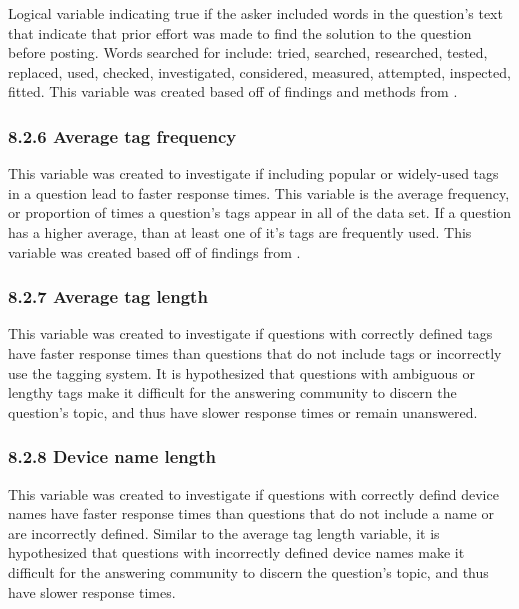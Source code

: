\documentclass{article}
\begin{document}
Logical variable indicating true if the asker included words in the question's text that indicate that prior effort was made to find the solution to the question before posting. Words searched for include: tried, searched, researched, tested, replaced, used, checked, investigated, considered, measured, attempted, inspected, fitted. This variable was created based off of findings and methods from \cite{Bhat2014} \cite{Harper2008}. 


\subsubsection*{8.2.6 Average tag frequency}

This variable was created to investigate if including popular or widely-used tags in a question lead to faster response times. This variable is the average frequency, or proportion of times a question's tags appear in all of the data set. If a question has a higher average, than at least one of it's tags are frequently used. This variable was created based off of findings from \cite{Bhat2014}. 


\subsubsection*{8.2.7 Average tag length}

This variable was created to investigate if questions with correctly defined tags have faster response times than questions that do not include tags or incorrectly use the tagging system. It is hypothesized that questions with ambiguous or lengthy tags make it difficult for the answering community to discern the question's topic, and thus have slower response times or remain unanswered. 


\subsubsection*{8.2.8 Device name length}

This variable was created to investigate if questions with correctly defind device names have faster response times than questions that do not include a name or are incorrectly defined. Similar to the average tag length variable, it is hypothesized that questions with incorrectly defined device names make it difficult for the answering community to discern the question's topic, and thus have slower response times. 
\end{document}
